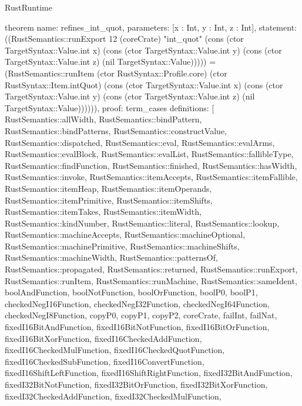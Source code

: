 \begin{lexlean}{RustRuntime}
\begin{semanticmodule}
theorem{
  name: refines_int_quot,
  parameters: [x : Int, y : Int, z : Int],
  statement: ((RustSemantics::runExport 12 (coreCrate) "int_quot" (cons (ctor TargetSyntax::Value.int x) (cons (ctor TargetSyntax::Value.int y) (cons (ctor TargetSyntax::Value.int z) (nil TargetSyntax::Value))))) = (RustSemantics::runItem (ctor RustSyntax::Profile.core) (ctor RustSyntax::Item.intQuot) (cons (ctor TargetSyntax::Value.int x) (cons (ctor TargetSyntax::Value.int y) (cons (ctor TargetSyntax::Value.int z) (nil TargetSyntax::Value)))))),
  proof: term_cases{
    definitions: [
      RustSemantics::allWidth,
      RustSemantics::bindPattern,
      RustSemantics::bindPatterns,
      RustSemantics::constructValue,
      RustSemantics::dispatched,
      RustSemantics::eval,
      RustSemantics::evalArms,
      RustSemantics::evalBlock,
      RustSemantics::evalList,
      RustSemantics::fallibleType,
      RustSemantics::findFunction,
      RustSemantics::finished,
      RustSemantics::hasWidth,
      RustSemantics::invoke,
      RustSemantics::itemAccepts,
      RustSemantics::itemFallible,
      RustSemantics::itemHeap,
      RustSemantics::itemOperands,
      RustSemantics::itemPrimitive,
      RustSemantics::itemShifts,
      RustSemantics::itemTakes,
      RustSemantics::itemWidth,
      RustSemantics::kindNumber,
      RustSemantics::literal,
      RustSemantics::lookup,
      RustSemantics::machineAccepts,
      RustSemantics::machineOptional,
      RustSemantics::machinePrimitive,
      RustSemantics::machineShifts,
      RustSemantics::machineWidth,
      RustSemantics::patternsOf,
      RustSemantics::propagated,
      RustSemantics::returned,
      RustSemantics::runExport,
      RustSemantics::runItem,
      RustSemantics::runMachine,
      RustSemantics::sameIdent,
      boolAndFunction,
      boolNotFunction,
      boolOrFunction,
      boolP0,
      boolP1,
      checkedNegI16Function,
      checkedNegI32Function,
      checkedNegI64Function,
      checkedNegI8Function,
      copyP0,
      copyP1,
      copyP2,
      coreCrate,
      failInt,
      failNat,
      fixedI16BitAndFunction,
      fixedI16BitNotFunction,
      fixedI16BitOrFunction,
      fixedI16BitXorFunction,
      fixedI16CheckedAddFunction,
      fixedI16CheckedMulFunction,
      fixedI16CheckedQuotFunction,
      fixedI16CheckedSubFunction,
      fixedI16ConvertFunction,
      fixedI16ShiftLeftFunction,
      fixedI16ShiftRightFunction,
      fixedI32BitAndFunction,
      fixedI32BitNotFunction,
      fixedI32BitOrFunction,
      fixedI32BitXorFunction,
      fixedI32CheckedAddFunction,
      fixedI32CheckedMulFunction,
}}
\end{semanticmodule}
\end{lexlean}

